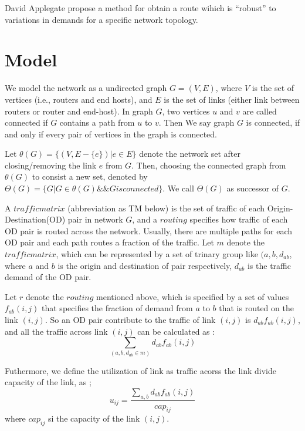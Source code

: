 \documentclass[conference]{IEEEtran}
\begin{document}
David Applegate propose a method for obtain a route wihich is ``robust'' to variations in demands for a specific network topology. 

\section{Model}
We model the network as a undirected graph $G = (V, E)$, where $V$ is the set of vertices (i.e., routers and end hosts), 
and $E$ is the set of links (either link between routers or router and end-host). In graph $G$, two vertices $u$ and $v$
are called connected if $G$ contains a path from $u$ to $v$. Then We say graph $G$ is connected, if and only if 
every pair of vertices in the graph is connected.

Let $\theta(G) = \{ (V, E - \{ e \}) | e \in E \}$ denote the network set after closing/removing the link $e$ from
$G$. Then, choosing the connected graph from $\theta(G)$ to consist a new set, denoted by 
$\Theta(G) = \{G | G \in \theta(G) \& \& G is connected\}$. We call $\Theta(G)$ as successor of $G$.

A $traffic matrix$ (abbreviation as TM below) is the set of traffic of each Origin-Destination(OD) pair in 
network $G$, and a $routing$ specifies how traffic of each OD pair is routed across the network. Usually, there are 
multiple paths for each OD pair and each path routes a fraction of the traffic. Let $m$ denote the $traffic matrix$, 
which can be represented by a set of trinary group like $(a, b, d_{ab}$, where $a$ and $b$ is the origin and 
destination of pair respectively, $d_{ab}$ is the traffic demand of the OD pair. 

Let $r$ denote the $routing$ mentioned above, which is specified by a set of values $f_{ab}(i,j)$ that specifies the 
fraction of demand from $a$ to $b$ that is routed on the link $(i,j)$. So an OD pair contribute to the traffic of 
link $(i,j)$ is $d_{ab}f_{ab}(i,j)$, and all the traffic across link $(i,j)$ can be calculated as :
\begin{equation}
	\sum_{(a,b,d_{ab}\in m)} d_{ab}f_{ab}(i,j)
\end{equation}

Futhermore, we define the utilization of link as traffic acorss the link divide capacity of the link, as ;
\begin{equation}
	u_{ij} = \frac{\sum_{a,b} d_{ab}f_{ab}(i,j)}{cap_{ij}}
\end{equation}
where $cap_{ij}$ si the capacity of the link $(i,j)$.
\end{document}

